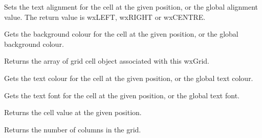 Sets the text alignment for the cell at the given position, or the global alignment value.
The return value is wxLEFT, wxRIGHT or wxCENTRE.

\label{wxgridgetcellbackgroundcolour}



Gets the background colour for the cell at the given position, or the global background colour.

\label{wxgridgetcells}


Returns the array of grid cell object associated with this wxGrid.

\label{wxgridgetcelltextcolour}



Gets the text colour for the cell at the given position, or the global text colour.

\label{wxgridgetcelltextfont}



Gets the text font for the cell at the given position, or the global text font.

\label{wxgridgetcellvalue}


Returns the cell value at the given position.

\label{wxgridgetcols}


Returns the number of columns in the grid.

\label{wxgridcolumnwidth}


